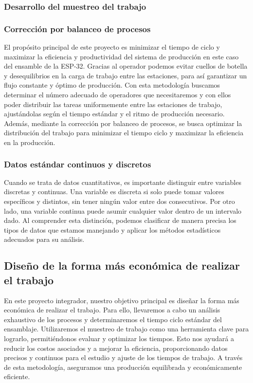     \subsubsection{Desarrollo del muestreo del trabajo}
    
    
    \subsubsection{Corrección por balanceo de procesos}
    El propósito principal de este proyecto es minimizar el tiempo de ciclo y maximizar la eficiencia y productividad del sistema de producción en este caso del ensamble de la ESP-32. Gracias al operador podemos evitar cuellos de botella y desequilibrios en la carga de trabajo entre las estaciones, para así garantizar un flujo constante y óptimo de producción. Con esta metodología buscamos determinar el número adecuado de operadores que necesitaremos y con ellos poder distribuir las tareas uniformemente entre las estaciones de trabajo, ajustándolas según el tiempo estándar y el ritmo de producción necesario. Además, mediante la corrección por balanceo de procesos, se busca optimizar la distribución del trabajo para minimizar el tiempo ciclo y maximizar la eficiencia en la producción.
    \subsubsection{Datos estándar continuos y discretos}
    Cuando se trata de datos cuantitativos, es importante distinguir entre variables discretas y continuas. Una variable es discreta si solo puede tomar valores específicos y distintos, sin tener ningún valor entre dos consecutivos. Por otro lado, una variable continua puede asumir cualquier valor dentro de un intervalo dado. Al comprender esta distinción, podemos clasificar de manera precisa los tipos de datos que estamos manejando y aplicar los métodos estadísticos adecuados para su análisis. \cite{Datoscontinuosydiscretos}
    \subsection{Diseño de la forma más económica de realizar el trabajo}
    En este proyecto integrador, nuestro objetivo principal es diseñar la forma más económica de realizar el trabajo. Para ello, llevaremos a cabo un análisis exhaustivo de los procesos y determinaremos el tiempo ciclo estándar del ensamblaje. Utilizaremos el muestreo de trabajo como una herramienta clave para lograrlo, permitiéndonos evaluar y optimizar los tiempos. Esto nos ayudará a reducir los costos asociados y a mejorar la eficiencia, proporcionando datos precisos y continuos para el estudio y ajuste de los tiempos de trabajo. A través de esta metodología, aseguramos una producción equilibrada y económicamente eficiente.
